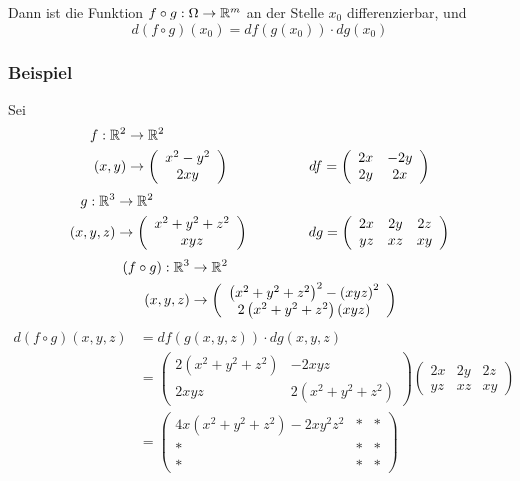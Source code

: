 Dann ist die Funktion $f\circ g:\Omega\to\mathbb{R}^m$ an der Stelle $x_0$ differenzierbar, und
\[d\left( f\circ g\right)\left( x_0\right)=df\left( g\left( x_0\right)\right)\cdot dg\left( x_0\right)\]

\subsubsection*{Beispiel}
Sei
\begin{align*}
f:\R^2 & \to\R^2\\
\left( x,y\right) & \to\left( {\begin{array}{*{20}{c}}
{{x^2} - {y^2}}\\
{2xy}
\end{array}} \right) \hspace{20mm}df = \left( {\begin{array}{*{20}{c}}
{2x}&{ - 2y}\\
{2y}&{2x}
\end{array}} \right)
\end{align*}
\begin{align*}
g:\R^3 & \to\R^2\\
\left( x,y,z\right) & \to\left( {\begin{array}{*{20}{c}}
{{x^2} +{y^2}+{z^2}}\\
{xyz}
\end{array}} \right) \hspace{15mm}dg = \left( {\begin{array}{*{20}{c}}
{2x}&{2y}&{2z}\\
{yz}&{xz}&{xy}
\end{array}} \right)
\end{align*}
\begin{align*}
\left( f\circ g\right):\R^3 & \to\R^2\\
\left(x,y,z\right)&\to \left( {\begin{array}{*{20}{c}}
{{{\left( {{x^2} + {y^2} + {z^2}} \right)}^2} - {{\left( {xyz} \right)}^2}}\\
{2\left( {{x^2} + {y^2} + {z^2}} \right)\left( {xyz} \right)}
\end{array}} \right)
\end{align*}
\begin{align*}
d\left( {f \circ g} \right)\left( {x,y,z} \right)&= df\left( {g\left( {x,y,z} \right)} \right) \cdot dg\left( {x,y,z} \right)\\
&= \left( {\begin{array}{*{20}{c}}
{2\left( {{x^2} + {y^2} + {z^2}} \right)}&{ - 2xyz}\\
{2xyz}&{2\left( {{x^2} + {y^2} + {z^2}} \right)}
\end{array}} \right)\left( {\begin{array}{*{20}{c}}
{2x}&{2y}&{2z}\\
{yz}&{xz}&{xy}
\end{array}} \right)\\
&=\left( {\begin{array}{*{20}{c}}
{4x\left( {{x^2} + {y^2} + {z^2}} \right) - 2x{y^2}{z^2}}& * & * \\
 * & * & * \\
 * & * & *
\end{array}} \right)
\end{align*}
